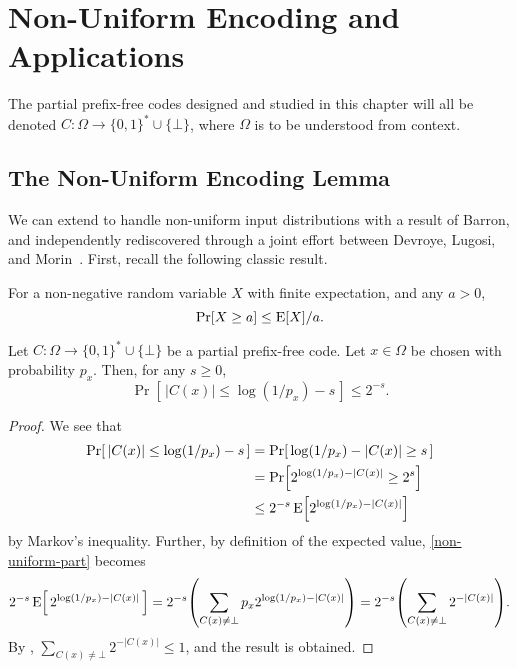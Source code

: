 \chapter{Non-Uniform Encoding and Applications}
The partial prefix-free codes designed and studied in this chapter
will all be denoted $C : \Omega \to \{0, 1\}^* \cup \{\bot\}$, where
$\Omega$ is to be understood from context.

\section{The Non-Uniform Encoding Lemma}

We can extend  to handle non-uniform input distributions
with a result of Barron, and independently rediscovered through a
joint effort between Devroye, Lugosi, and
Morin~\cite{devroye:workshop}. First, recall the following classic
result.

\begin{thm}
  For a non-negative random variable $X$ with finite expectation, and
  any $a > 0$,
  \[
  \Pr[X \geq a] \leq \operatorname{\mathrm{E}}[X]/a .
  \]
\end{thm}

\begin{lem}
  Let $C : \Omega \to \{0, 1\}^* \cup \{\bot\}$ be a partial
  prefix-free code. Let $x \in \Omega$ be chosen with probability
  $p_x$. Then, for any $s \geq 0$,
  \[\Pr\left[\,|C(x)| \leq \log (1/p_x) - s\,\right]
  \leq 2^{-s}.\]
\end{lem}
\begin{proof}
  We see that
  \begin{align}
    \Pr\left[\,|C(x)| \leq \log(1/p_x) - s\,\right] & = \Pr\left[\,\log(1/p_x) - |C(x)| \geq s\,\right] \notag \\
    & = \Pr\left[2^{\log(1/p_x) - |C(x)|} \geq 2^s\right] \notag \\
    & \leq 2^{-s} \E\left[2^{\log(1/p_x) - |C(x)|}\right] \eqlabel{non-uniform-part}
  \end{align}
  by Markov's inequality. Further, by definition of the expected
  value, \eqref{non-uniform-part} becomes
  \begin{align*}
    2^{-s} \E\left[\,2^{\log(1/p_x) - |C(x)|}\,\right] = 2^{-s} \left(\sum_{C(x) \neq \bot} p_x 2^{\log(1/p_x) - |C(x)|}\right) = 2^{-s} \left(\sum_{C(x) \neq \bot} 2^{-|C(x)|} \right).
  \end{align*}
  By ,
  $\sum_{C(x) \neq \bot} 2^{-|C(x)|} \leq 1$, and the result is
  obtained.
\end{proof}

